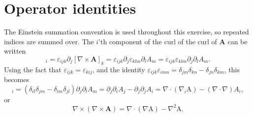 \documentclass{article}
\begin{document}
    \section{Operator identities}
        The Einstein summation convention is used throughout this exercise, so repeated indices are summed over. The $i$'th component of the curl of the curl of $\mathbf{A}$ can be written
        \begin{equation*}
            [\nabla \times (\nabla \times \mathbf{A})]_i = \varepsilon_{ijk} \partial_j[\nabla \times \mathbf{A}]_k = \varepsilon_{ijk} \partial_j \varepsilon_{klm} \partial_l A_m = \varepsilon_{ijk} \varepsilon_{klm} \partial_j \partial_l A_m.
        \end{equation*}
        Using the fact that $\varepsilon_{ijk} = \varepsilon_{kij}$, and the identity $\varepsilon_{ijk}\varepsilon_{imn} = \delta_{jm} \delta_{kn} - \delta_{jn}\delta_{km}$, this becomes
        \begin{equation*}
            [\nabla \times (\nabla \times \mathbf{A})]_i = (\delta_{il}\delta_{jm} - \delta_{im}\delta_{jl}) \partial_j \partial_l A_m = \partial_j \partial_i A_j - \partial_j \partial_j A_i = \nabla \cdot (\nabla_i \mathrm{A}) - (\nabla \cdot \nabla) A_i,
        \end{equation*}
        or
        \begin{equation*}
            \nabla \times (\nabla \times \mathbf{A}) = \nabla \cdot (\nabla \mathrm{A}) - \nabla^2 \mathrm{A}.
        \end{equation*}
\end{document}
